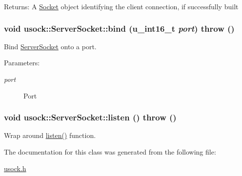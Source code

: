 \begin{Desc}
\item[Returns:]A \hyperlink{classusock_1_1Socket}{Socket} object identifying the client connection, if successfully built \end{Desc}
\hypertarget{classusock_1_1ServerSocket_9ecf37cae8379df6eaf366ab88df244a}{
\subsubsection[{bind}]{\setlength{\rightskip}{0pt plus 5cm}void usock::ServerSocket::bind (u\_\-int16\_\-t {\em port})  throw ()}}
\label{classusock_1_1ServerSocket_9ecf37cae8379df6eaf366ab88df244a}


Bind \hyperlink{classusock_1_1ServerSocket}{ServerSocket} onto a port. 

\begin{Desc}
\item[Parameters:]
\begin{description}
\item[{\em port}]Port \end{description}
\end{Desc}
\hypertarget{classusock_1_1ServerSocket_c6cd2070380b84275c5f69265c57713b}{
\subsubsection[{listen}]{\setlength{\rightskip}{0pt plus 5cm}void usock::ServerSocket::listen ()  throw ()}}
\label{classusock_1_1ServerSocket_c6cd2070380b84275c5f69265c57713b}


Wrap around \hyperlink{classusock_1_1ServerSocket_c6cd2070380b84275c5f69265c57713b}{listen()} function. 



The documentation for this class was generated from the following file:\begin{CompactItemize}
\item 
\hyperlink{usock_8h}{usock.h}\end{CompactItemize}
